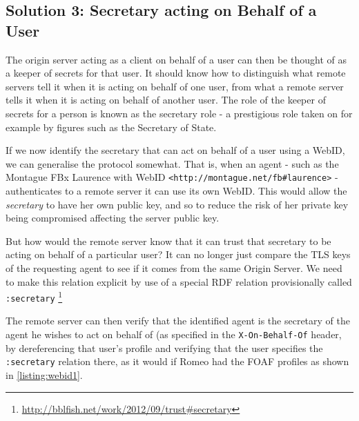 \documentclass[a4paper]{llncs}
\begin{document}

\subsection{Solution 3: Secretary acting on Behalf of a User}

The origin server acting as a client on behalf of a user can then be thought of as a keeper of secrets for that user.
It should know how to distinguish what remote servers tell it when it is acting on behalf of one user, from what a remote server tells it when it is acting on behalf of another user.
The role of the keeper of secrets for a person is known as the secretary role - a prestigious role taken on for example by figures such as the Secretary of State.

If we now identify the secretary that can act on behalf of a user using a WebID, we can generalise the protocol somewhat.
That is, when an agent - such as the Montague FBx Laurence with WebID \lstinline|<http://montague.net/fb#laurence>| - authenticates to a remote server it can use its own WebID. 
This would allow the \textit{secretary} to have her own public key, and so to reduce the risk of her private key being compromised affecting the server public key.

But how would the remote server know that it can trust that secretary to be acting on behalf of a particular user?
It can no longer just compare the TLS keys of the requesting agent to see if it comes from the same Origin Server.
We need to make this relation explicit by use of a special RDF relation provisionally called \lstinline|:secretary|%
\footnote{\url{http://bblfish.net/work/2012/09/trust#secretary} }

%

The remote server can then verify that the identified agent is the secretary of the agent he wishes to act on behalf of (as specified in the \lstinline|X-On-Behalf-Of| header, by dereferencing that user's profile and verifying that the user specifies the \texttt{:secretary} relation there, as it would if Romeo had the FOAF profiles as shown in \autoref{listing:webid1}.


\end{document}
